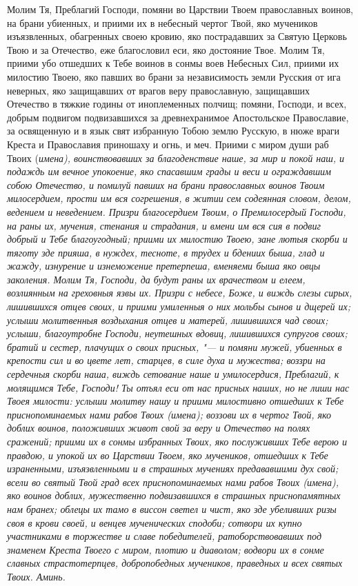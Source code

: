 Молим Тя, Преблагий Господи, помяни во Царствии Твоем православных воинов, на брани убиенных, и приими их в небесный чертог Твой, яко мучеников изъязвленных, обагренных своею кровию, яко пострадавших за Святую Церковь Твою и за Отечество, еже благословил еси, яко достояние Твое. Молим Тя, приими убо отшедших к Тебе воинов в сонмы воев Небесных Сил, приими их милостию Твоею, яко павших во брани за независимость земли Русския от ига неверных, яко защищавших от врагов веру православную, защищавших Отечество в тяжкие годины от иноплеменных полчищ; помяни, Господи, и всех, добрым подвигом подвизавшихся за древнехранимое Апостольское Православие, за освященную и в язык свят избранную Тобою землю Русскую, в нюже враги Креста и Православия приношаху и огнь, и меч. Приими с миром души раб Твоих (\itshape имена\normalfont{}), воинствовавших за благоденствие наше, за мир и покой наш, и подаждь им вечное упокоение, яко спасавшим грады и веси и ограждавшим собою Отечество, и помилуй павших на брани православных воинов Твоим милосердием, прости им вся согрешения, в житии сем содеянная словом, делом, ведением и неведением. Призри благосердием Твоим, о Премилосердый Господи, на раны их, мучения, стенания и страдания, и вмени им вся сия в подвиг добрый и Тебе благоугодный; приими их милостию Твоею, зане лютыя скорби и тяготу зде прияша, в нуждех, тесноте, в трудех и бдениих быша, глад и жажду, изнурение и изнеможение претерпеша, вменяеми быша яко овцы заколения. Молим Тя, Господи, да будут раны их врачеством и елеем, возлиянным на греховныя язвы их. Призри с небесе, Боже, и виждь слезы сирых, лишившихся отцев своих, и приими умиленныя о них мольбы сынов и дщерей их; услыши молитвенныя воздыхания отцев и матерей, лишившихся чад своих; услыши, благоутробне Господи, неутешных вдовиц, лишившихся супругов своих; братий и сестер, плачущих о своих присных, "--- и помяни мужей, убиенных в крепости сил и во цвете лет, старцев, в силе духа и мужества; воззри на сердечныя скорби наша, виждь сетование наше и умилосердися, Преблагий, к молящимся Тебе, Господи! Ты отъял еси от нас присных наших, но не лиши нас Твоея милости: услыши молитву нашу и приими милостивно отшедших к Тебе приснопоминаемых нами рабов Твоих (\itshape имена\normalfont{}); воззови их в чертог Твой, яко доблих воинов, положивших живот свой за веру и Отечество на полях сражений; приими их в сонмы избранных Твоих, яко послуживших Тебе верою и правдою, и упокой их во Царствии Твоем, яко мучеников, отшедших к Тебе израненными, изъязвленными и в страшных мучениях предававшими дух свой; всели во святый Твой град всех приснопоминаемых нами рабов Твоих (\itshape имена\normalfont{}), яко воинов доблих, мужественно подвизавшихся в страшных приснопамятных нам бранех; облецы их тамо в виссон светел и чист, яко зде убеливших ризы своя в крови своей, и венцев мученических сподоби; сотвори их купно участниками в торжестве и славе победителей, ратоборствовавших под знаменем Креста Твоего с миром, плотию и диаволом; водвори их в сонме славных страстотерпцев, добропобедных мучеников, праведных и всех святых Твоих. Аминь. 





